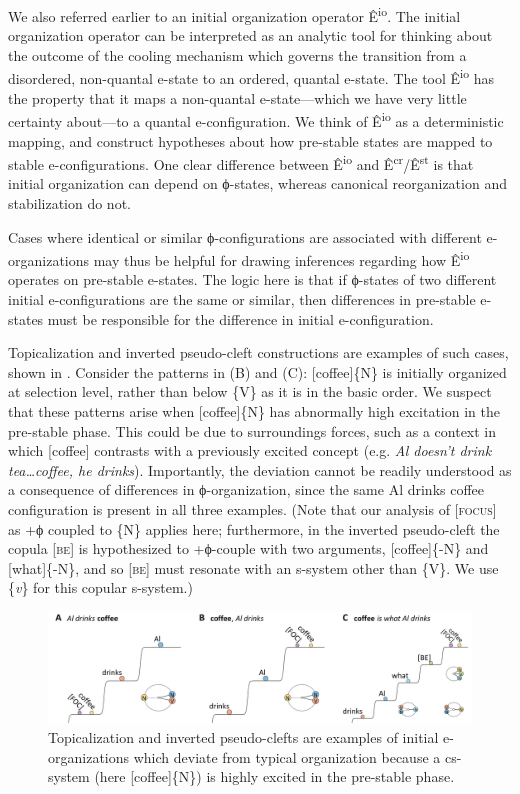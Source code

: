   We also referred earlier to an initial organization operator Ê\textsuperscript{io}. The initial organization operator can be interpreted as an analytic tool for thinking about the outcome of the cooling mechanism which governs the transition from a disordered, non-quantal e-state to an ordered, quantal e-state. The tool Ê\textsuperscript{io} has the property that it maps a non-quantal e-state—which we have very little certainty about—to a quantal e-configuration. We think of Ê\textsuperscript{io} as a deterministic mapping, and construct hypotheses about how pre-stable states are mapped to stable e-configurations. One clear difference between Ê\textsuperscript{io} and Ê\textsuperscript{cr}/Ê\textsuperscript{st} is that initial organization can depend on ϕ-states, whereas canonical reorganization and stabilization do not. 

  Cases where identical or similar ϕ-configurations are associated with different e-organizations may thus be helpful for drawing inferences regarding how Ê\textsuperscript{io} operates on pre-stable e-states. The logic here is that if ϕ-states of two different initial e-configurations are the same or similar, then differences in pre-stable e-states must be responsible for the difference in initial e-configuration. 

  Topicalization and inverted pseudo-cleft constructions are examples of such cases, shown in {}. Consider the patterns in (B) and (C): [coffee]\{N\} is initially organized at selection level, rather than below \{V\} as it is in the basic order. We suspect that these patterns arise when [coffee]\{N\} has abnormally high excitation in the pre-stable phase. This could be due to surroundings forces, such as a context in which [coffee] contrasts with a previously excited concept (e.g. \textit{Al doesn't drink tea…coffee, he drinks}). Importantly, the deviation cannot be readily understood as a consequence of differences in ϕ-organization, since the same {\textbar}Al drinks coffee{\textbar} configuration is present in all three examples. (Note that our analysis of [\textsc{focus}] as +ϕ coupled to \{N\} applies here; furthermore, in the inverted pseudo-cleft the copula [\textsc{be}] is hypothesized to +ϕ-couple with two arguments, [coffee]\{-N\} and [what]\{-N\}, and so [\textsc{be}] must resonate with an s-system other than \{V\}. We use \{\textit{v}\} for this copular s-system.)

  
\begin{figure}
\includegraphics[width=\textwidth]{figures/Tilsen-img78.png}
\caption{Topicalization and inverted pseudo-clefts are examples of initial e-organizations which deviate from typical organization because a cs-system (here [coffee]\{N\}) is highly excited in the pre-stable phase.}
\label{fig:4:28}
\end{figure}
 


